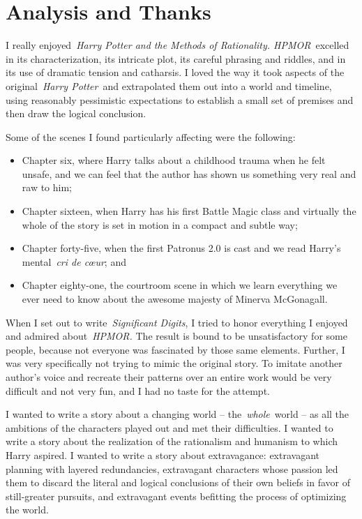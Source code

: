\Startbonus

\hypertarget{analysis-and-thanks}{%
\chapter{Analysis and Thanks}\label{analysis-and-thanks}}

I really enjoyed~\emph{Harry Potter and the Methods of Rationality.
HPMOR}~excelled in its characterization, its intricate plot, its careful
phrasing and riddles, and in its use of dramatic tension and catharsis.
I loved the way it took aspects of the original~\emph{Harry Potter}~and
extrapolated them out into a world and timeline, using reasonably
pessimistic expectations to establish a small set of premises and then
draw the logical conclusion.

Some of the scenes I found particularly affecting were the following:

\begin{itemize}
\tightlist
\item
  Chapter six, where Harry talks about a childhood trauma when he felt
  unsafe, and we can feel that the author has shown us something very
  real and raw to him;
\item
  Chapter sixteen, when Harry has his first Battle Magic class and
  virtually the whole of the story is set in motion in a compact and
  subtle way;
\item
  Chapter forty-five, when the first Patronus 2.0 is cast and we read
  Harry's mental~\emph{cri de cœur}; and
\item
  Chapter eighty-one, the courtroom scene in which we learn everything
  we ever need to know about the awesome majesty of Minerva McGonagall.
\end{itemize}

When I set out to write~\emph{Significant Digits}, I tried to honor
everything I enjoyed and admired about~\emph{HPMOR.} The result is bound
to be unsatisfactory for some people, because not everyone was
fascinated by those same elements. Further, I was very specifically not
trying to mimic the original story. To imitate another author's voice
and recreate their patterns over an entire work would be very difficult
and not very fun, and I had no taste for the attempt.

I wanted to write a story about a changing world --
the~\emph{whole}~world -- as all the ambitions of the characters played
out and met their difficulties. I wanted to write a story about the
realization of the rationalism and humanism to which Harry aspired. I
wanted to write a story about extravagance: extravagant planning with
layered redundancies, extravagant characters whose passion led them to
discard the literal and logical conclusions of their own beliefs in
favor of still-greater pursuits, and extravagant events befitting the
process of optimizing the world.

